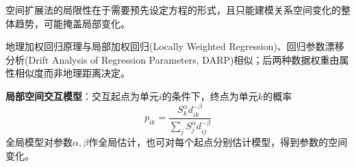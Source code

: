 \par 空间扩展法的局限性在于需要预先设定方程的形式，且只能建模关系空间变化的整体趋势，可能掩盖局部变化。

\par 地理加权回归原理与局部加权回归(Locally Weighted Regression)、回归参数漂移分析(Drift Analysis of Regression Parameters, DARP)相似；后两种数据权重由属性相似度而非地理距离决定。

\par \textbf{局部空间交互模型}：交互起点为单元$i$的条件下，终点为单元$k$的概率
\begin{equation}
    p_{ik}=\frac{S_k^\alpha d_{ik}^{-\beta}}{\sum_j S_j^\alpha d_{ij}^{-\beta}}
\end{equation}
全局模型对参数$\alpha,\beta$作全局估计，也可对每个起点分别估计模型，得到参数的空间变化。
